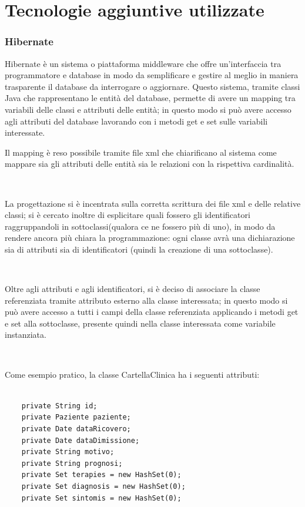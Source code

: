 \documentclass[a4paper,titlepage]{article}
\begin{document}
\part{Tecnologie aggiuntive utilizzate}

\section{Hibernate}

Hibernate è un sistema o piattaforma middleware che offre un'interfaccia tra programmatore e database in modo da semplificare e gestire al meglio in maniera trasparente il database da interrogare o aggiornare. Questo sistema, tramite classi Java che rappresentano le entità del database, permette di avere un mapping tra variabili delle classi e attributi delle entità; in questo modo si può avere accesso agli attributi del database lavorando con i metodi get e set sulle variabili interessate.

Il mapping è reso possibile tramite file xml che chiarificano al sistema come mappare sia gli attributi delle entità sia le relazioni con la rispettiva cardinalità.

~

La progettazione si è incentrata sulla corretta scrittura dei file xml e delle relative classi; si è cercato inoltre di esplicitare quali fossero gli identificatori raggruppandoli in sottoclassi(qualora ce ne fossero più di uno), in modo da rendere ancora più chiara la programmazione: ogni classe avrà una dichiarazione sia di attributi sia di identificatori (quindi la creazione di una sottoclasse).

~

Oltre agli attributi e agli identificatori, si è deciso di associare la classe referenziata tramite attributo esterno alla classe interessata; in questo modo si può avere accesso a tutti i campi della classe referenziata applicando i metodi get e set alla sottoclasse, presente quindi nella classe interessata come variabile instanziata.

~

Come esempio pratico, la classe CartellaClinica ha i seguenti attributi:

\begin{lstlisting}

	private String id;
	private Paziente paziente;
	private Date dataRicovero;
	private Date dataDimissione;
	private String motivo;
	private String prognosi;
	private Set terapies = new HashSet(0);
	private Set diagnosis = new HashSet(0);
	private Set sintomis = new HashSet(0);

\end{lstlisting}
\end{document}
